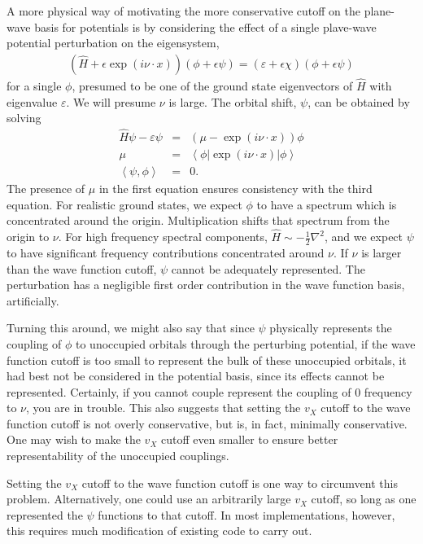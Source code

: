 \documentclass{article}
\newcommand{\beas}{\begin{eqnarray*}}
\newcommand{\enas}{\end{eqnarray*}}
\newcommand{\half}{{\frac{1}{2}}} \newcommand{\quarter}{{\frac{1}{4}}}
\newcommand{\paren}[1]{\left({#1}\right)}
\newcommand{\inp}[1]{\left<{#1}\right>}
\begin{document}
A more physical way of motivating the more conservative cutoff on
the plane-wave basis for potentials is by considering the effect of
a single plave-wave potential perturbation on the eigensystem,
\beas
\paren{\hat{H} + \epsilon \exp(i \nu \cdot x) } (\phi + \epsilon \psi)
 = (\varepsilon + \epsilon \chi) (\phi + \epsilon \psi)
\enas
for a single $\phi$, presumed to be one of the ground state
eigenvectors of $\hat{H}$ with eigenvalue $\varepsilon$.  We will
presume $\nu$ is large.  The
orbital shift, $\psi$, can be obtained by solving
\beas
 \hat{H} \psi - \varepsilon \psi &=& \paren{ \mu - \exp(i \nu \cdot x) } \phi\\
 \mu &=& \inp{ \phi \left| \exp(i \nu \cdot x) \right| \phi }\\
 \inp{\psi,\phi} &=& 0.
\enas
The presence of $\mu$ in the first equation ensures consistency with
the third equation.  For realistic ground states, we expect $\phi$
to have a spectrum which is concentrated around the origin.  Multiplication
shifts that spectrum from the origin to $\nu$.  For high frequency
spectral components, $\hat{H} \sim -\half \nabla^2$, and we expect
$\psi$ to have significant frequency contributions concentrated around $\nu$.
If $\nu$ is larger than the wave function cutoff, $\psi$ cannot be
adequately represented.  The perturbation has a negligible first
order contribution in the wave function basis, artificially.

Turning this around, we might also say that since $\psi$ physically
represents the coupling of $\phi$ to unoccupied orbitals
through the perturbing potential, if the wave function cutoff is
too small to represent the bulk of these unoccupied orbitals, it
had best not be considered in the potential basis, since its effects
cannot be represented.  Certainly, if you cannot couple represent
the coupling of $0$ frequency to $\nu$, you are in trouble.  This
also suggests that setting the $v_X$ cutoff to the wave function
cutoff is not overly conservative, but is, in fact, minimally
conservative.  One may wish to make the $v_X$ cutoff even
smaller to ensure better representability of the unoccupied couplings.

Setting the $v_X$ cutoff to the wave function cutoff is one way to
circumvent this problem.  Alternatively, one could use an arbitrarily
large $v_X$ cutoff, so long as one represented the $\psi$ functions
to that cutoff.  In most implementations, however, this requires much
modification of existing code to carry out.
\end{document}

